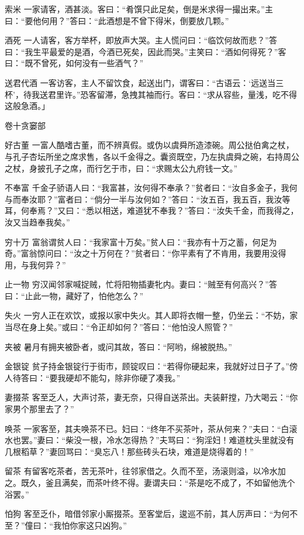 \documentclass[12pt,UTF8]{ctexbook}
\begin{document}
索米
一家请客，酒甚淡。客曰：“肴馔只此足矣，倒是米求得一撮出来。”主曰：“要他何用？”答曰：“此酒想是不曾下得米，倒要放几颗。”

酒死
一人请客，客方举杯，即放声大哭。主人慌问曰：“临饮何故而悲？”答曰：“我生平最爱的是酒，今酒已死矣，因此而哭。”主笑曰：“酒如何得死？”客曰：“既不曾死，如何没有一些酒气？”

送君代酒
一客访客，主人不留饮食，起送出门，谓客曰：“古语云：‘远送当三杯’，待我送君里许。”恐客留滞，急拽其袖而行。客曰：“求从容些，量浅，吃不得这般急酒。」

卷十贪窭部

好古董
一富人酷嗜古董，而不辨真假。或伪以虞舜所造漆碗。周公挞伯禽之杖，与孔子杏坛所坐之席求售，各以千金得之。囊资既空，乃左执虞舜之碗，右持周公之杖，身披孔子之席，而行乞于市，曰：“求赐太公九府钱一文。”

不奉富
千金子骄语人曰：“我富甚，汝何得不奉承？”贫者曰：“汝自多金子，我何与而奉汝耶？”富者曰：“倘分一半与汝何如？”答曰：“汝五百，我五百，我汝等耳，何奉焉？”又曰：“悉以相送，难道犹不奉我？”答曰：“汝失千金，而我得之，汝又当趋奉我矣。”

穷十万
富翁谓贫人曰：“我家富十万矣。”贫人曰：“我亦有十万之蓄，何足为奇。”富翁惊问曰：“汝之十万何在？”贫者曰：“你平素有了不肯用，我要用没得用，与我何异？”

止一物
穷汉闻邻家喊捉贼，忙将阳物插妻牝内。妻曰：“贼至有何高兴？”答曰：“止此一物，藏好了，怕他怎么？”

失火
一穷人正在欢饮，或报以家中失火。其人即将衣帽一整，仍坐云：“不妨，家当尽在身上矣。”或曰：“令正却如何？”答曰：“他怕没人照管？”

夹被
暑月有拥夹被卧者，或问其故，答曰：“阿哟，绵被脱热。”

金银锭
贫子持金银锭行于街市，顾锭叹曰：“若得你硬起来，我就好过日子了。”傍人待答曰：“要我硬却不能勾，除非你硬了凑我。”

妻掇茶
客至乏人，大声讨茶，妻无奈，只得自送茶出。夫装鼾摚，乃大喝云：“你家男个那里去了？”

唤茶
一家客至，其夫唤茶不已。妇曰：“终年不买茶叶，茶从何来？”夫曰：“白滚水也罢。”妻曰：“柴没一根，冷水怎得热？”夫骂曰：“狗淫妇！难道枕头里就没有几根稻草？”妻回骂曰：“臭忘八！那些砖头石块，难道是烧得着的！”

留茶
有留客吃茶者，苦无茶叶，往邻家借之。久而不至，汤滚则溢，以冷水加之。既久，釜且满矣，而茶叶终不得。妻谓夫曰：“茶是吃不成了，不如留他洗个浴罢。”

怕狗
客至乏仆，暗借邻家小厮掇茶。至客堂后，逡巡不前，其人厉声曰：“为何不至？”僮曰：“我怕你家这只凶狗。”
\end{document}
